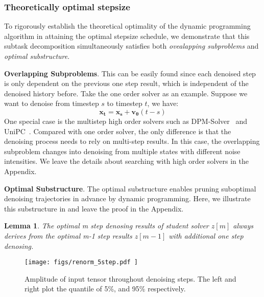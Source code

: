 \documentclass[10pt,twocolumn,letterpaper]{article}
\newtheorem{lemma}[theorem]{Lemma}
\begin{document}
    \subsubsection{Theoretically optimal stepsize}
    To rigorously establish the theoretical optimality of the dynamic programming algorithm in attaining the optimal stepsize schedule, we demonstrate that this subtask decomposition simultaneously satisfies both \emph{ovealapping subproblems} and \emph{optimal substructure}. 

    {\bf Overlapping Subproblems}. This can be easily found since each denoised step is only dependent on the previous one step result, which is independent of the denoised history before. Take the one order solver as an example. Suppose we want to denoise from timestep $s$ to timestep $t$, we have:
    \begin{equation}
        \bm{x_t} = \bm{x_s} + \bm{v_{\theta}}(t-s)    
    \end{equation}
    One special case is the multistep high order solvers such as DPM-Solver~\cite{dpm++} and UniPC~\cite{unipc}. 
    Compared with one order solver, the only difference is that the denoising process needs to rely on multi-step results. In this case, the overlapping subproblem changes into denoising from multiple states with different noise intensities. We leave the details about searching with high order solvers in the Appendix.


    {\bf Optimal Substructure}. 
    The optimal substructure enables pruning suboptimal denoising trajectories in advance by dynamic programming. Here, we illustrate this substructure in  and leave the proof in the Appendix.
    
    

    \begin{lemma} \label{lemma}
        The optimal m step denosing results of student solver $z[m]$ always derives from the optimal m-1 step results $z[m-1]$ with additional one step denosing.
    \end{lemma}

    

     

    \begin{figure}[H]
        \centering
        \vspace{-0.6cm}
        \texttt{[image: 
            figs/renorm\_5step.pdf
        ]}
        \vspace{-0.6cm}
        \caption{Amplitude of input tensor throughout denoising steps. The left and right plot the quantile of 5\%, and 95\% respectively.}
        \label{fig:maxmin}
    \end{figure}
\end{document}
